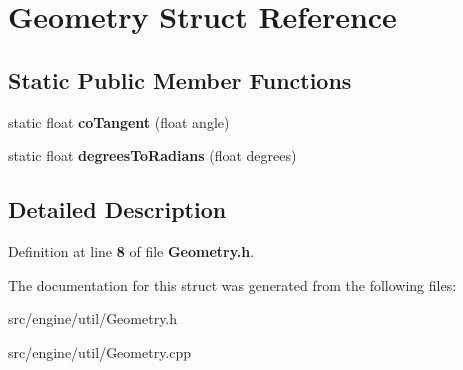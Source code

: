 \section{Geometry Struct Reference}
\label{struct_geometry}
\subsection*{Static Public Member Functions}
\begin{DoxyCompactItemize}
\item 
\mbox{\label{struct_geometry_ac2f8cbecbd828d321ad0c580abe554a8}} 
static float {\bfseries co\+Tangent} (float angle)
\item 
\mbox{\label{struct_geometry_a52f9924f5569adc08fe8b0b4510d5316}} 
static float {\bfseries degrees\+To\+Radians} (float degrees)
\end{DoxyCompactItemize}


\subsection{Detailed Description}


Definition at line \textbf{ 8} of file \textbf{ Geometry.\+h}.



The documentation for this struct was generated from the following files\+:\begin{DoxyCompactItemize}
\item 
src/engine/util/Geometry.\+h\item 
src/engine/util/Geometry.\+cpp\end{DoxyCompactItemize}
